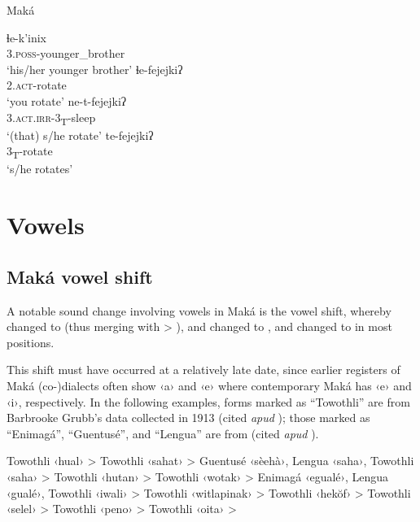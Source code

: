 \ea
    Maká \citep[85, 148]{AG94}
    \begin{xlist}
        \ex\gll ɬe-k’inix\\
                3.{\textsc{poss}}-younger\_brother\\
                \glt `his/her younger brother'
        \ex\gll ɬe-fejejkiʔ\\
                2.{\textsc{act}}-rotate\\
                \glt `you rotate'
        \ex\gll ne-t-fejejkiʔ\\
                3.{\textsc{act.irr}}-3\textsubscript{T}-sleep\\
                \glt `(that) s/he rotate'
        \ex\gll te-fejejkiʔ\\
                3\textsubscript{T}-rotate\\
                \glt `s/he rotates'
    \end{xlist}
\z

\section{Vowels}\label{mk-vow}
\subsection{Maká vowel shift}\label{mk-vowel-shift}
A notable sound change involving vowels in Maká is the vowel shift, whereby  changed to  (thus merging with  > ),  and  changed to , and  changed to  in most positions.

This shift must have occurred at a relatively late date, since earlier registers of Maká (co-)dialects often show ‹a› and ‹e› where contemporary Maká has ‹e› and ‹i›, respectively. In the following examples, forms marked as ``Towothli'' are from Barbrooke Grubb’s data collected in 1913 (cited {\textit{apud}} ); those marked as ``Enimagá'', ``Guentusé'', and ``Lengua'' are from \citet{JFA93} (cited {\textit{apud}} ).

\newpage
{}
\begin{exe}
    \ex Towothli ‹hual› > 
    \ex Towothli ‹sahat› > 
    \ex Guentusé ‹sèehà›, Lengua ‹saha›, Towothli ‹saha› > 
    \ex Towothli ‹hutan› > 
    \ex Towothli ‹wotak› > 
    \ex Enimagá ‹egualé›, Lengua ‹gualé›, Towothli ‹iwali› > 
    \ex Towothli ‹witlapinak› > 
    \ex Towothli ‹hekŏf› > 
    \ex Towothli ‹selel› > 
    \ex Towothli ‹peno› > 
    \ex Towothli ‹oita› > 
\end{exe}

